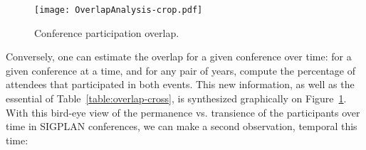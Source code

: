 



\begin{figure}
  \centering
  \texttt{[image: OverlapAnalysis-crop.pdf]}
  \caption{Conference participation overlap.}
  \label{fig:overlap}
\end{figure}

Conversely, one can estimate the overlap for a given conference over time: for a
given conference at a time, and for any pair of years, compute the percentage of
attendees that participated in both events. This new information, as well as
the essential of Table~\ref{table:overlap-cross}, is synthesized graphically on
Figure~\ref{fig:overlap}.
With this bird-eye view of the permanence vs. transience of the
participants over time in SIGPLAN conferences, we can make a second observation,
temporal this time:

